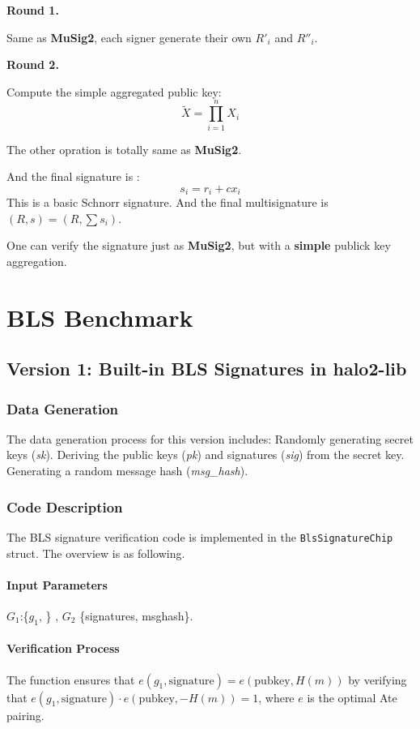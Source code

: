 \documentclass{article}
\begin{document}
\textbf{Round 1.}


Same as \textbf{MuSig2}, each signer generate their own $R'_i$ and $R''_i$.


\textbf{Round 2.}

Compute the simple aggregated public key:
\[
\tilde X = \prod_{i=1}^{n} X_i
\]

The other opration is totally same as \textbf{MuSig2}.

And the final signature is :
\[
s_i=r_i+cx_i
\]
This is a basic Schnorr signature. And the final multisignature is $(R,s) = (R, \sum s_i)$.

One can verify the signature just as \textbf{MuSig2}, but with a \textbf{simple} publick key aggregation.



\section{BLS Benchmark}


\subsection{Version 1: Built-in BLS Signatures in halo2-lib}
\subsubsection{Data Generation}
The data generation process for this version includes:
Randomly generating secret keys (\textit{sk}).
Deriving the public keys (\textit{pk}) and signatures (\textit{sig}) from the secret key.
Generating a random message hash (\textit{msg\_hash}).


\subsubsection{Code Description}

The BLS signature verification code is implemented in the \texttt{BlsSignatureChip} struct. The overview is as following.



\paragraph{Input Parameters} 

$G_1$:\{$g_1$, \} , $G_2$ \{signatures, msghash\}.

\paragraph{Verification Process}
The function ensures that $e(g_1, \text{signature}) = e(\text{pubkey}, H(m))$ by verifying that $e(g_1, \text{signature}) \cdot e(\text{pubkey}, -H(m)) = 1$, where $e$ is the optimal Ate pairing.
\end{document}

